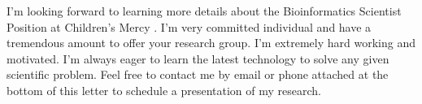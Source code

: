 \documentclass[11pt,a4paper,sans]{moderncv}        %
\begin{document}
\vspace{0.1in}
I'm looking forward to learning more details about the Bioinformatics Scientist Position at Children's Mercy . I'm very committed individual and have a tremendous amount
 to offer your research group. I'm extremely hard working and motivated. I'm always eager to learn the latest technology to solve any given scientific problem. 
Feel free to contact me by email or phone attached at the bottom of this letter  to schedule a presentation of my research. 

\makeletterclosing
\end{document}
